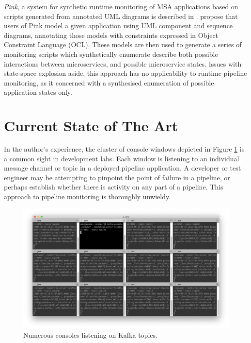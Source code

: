 \textit{Pink}, a system for synthetic runtime monitoring of MSA applications based on scripts generated from annotated UML diagrams is described in \cite{8377902}.  \citeauthor{8377902} propose that users of Pink model a given application using UML component and sequence diagrams, annotating those models with constraints expressed in Object Constraint Language (OCL). These models are then used to generate a series of monitoring scripts which synthetically enumerate describe both possible interactions between microservices, and possible microservice states. Issues with state-space explosion aside, this approach has no applicability to runtime pipeline monitoring, as it concerned with a synthesised enumeration of possible application states only. 

\section{Current State of The Art}

In the author's experience, the cluster of console windows depicted in Figure \ref{console_monitoring} is a common sight in development labs. Each window is listening to an individual message channel or topic in a deployed pipeline application. A developer or test engineer may be attempting to pinpoint the point of failure in a pipeline, or perhaps establish whether there is activity on any part of a pipeline. This approach to pipeline monitoring is thoroughly unwieldy.

\begin{figure}[H]
	\centering  
	\includegraphics[scale=0.3]{figures/background/monitoring.png}
	\caption{Numerous consoles listening on Kafka topics.}
	\label{console_monitoring}
\end{figure}

